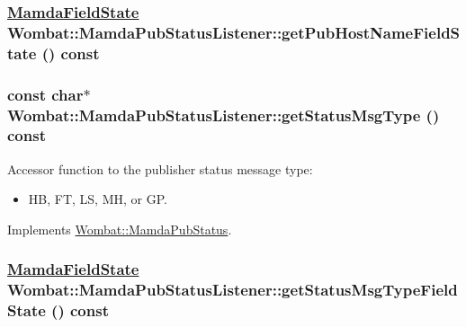 \hypertarget{classWombat_1_1MamdaPubStatusListener_0113c4afc2de92bbae16a85dbd0b76a5}{
\subsubsection[getPubHostNameFieldState]{\setlength{\rightskip}{0pt plus 5cm}\hyperlink{namespaceWombat_93aac974f2ab713554fd12a1fa3b7d2a}{Mamda\-Field\-State} Wombat::Mamda\-Pub\-Status\-Listener::get\-Pub\-Host\-Name\-Field\-State () const}}
\label{classWombat_1_1MamdaPubStatusListener_0113c4afc2de92bbae16a85dbd0b76a5}


\hypertarget{classWombat_1_1MamdaPubStatusListener_e18c97b1a454d45755dd48f8a56a742d}{
\subsubsection[getStatusMsgType]{\setlength{\rightskip}{0pt plus 5cm}const char$\ast$ Wombat::Mamda\-Pub\-Status\-Listener::get\-Status\-Msg\-Type () const}}
\label{classWombat_1_1MamdaPubStatusListener_e18c97b1a454d45755dd48f8a56a742d}


Accessor function to the publisher status message type:\begin{itemize}
\item HB, FT, LS, MH, or GP. \end{itemize}




Implements \hyperlink{classWombat_1_1MamdaPubStatus_72d3f8a795323662c919e6f7cdd12a66}{Wombat::Mamda\-Pub\-Status}.\hypertarget{classWombat_1_1MamdaPubStatusListener_f9c9da5b1ab98b723a87fe8a460b3901}{
\subsubsection[getStatusMsgTypeFieldState]{\setlength{\rightskip}{0pt plus 5cm}\hyperlink{namespaceWombat_93aac974f2ab713554fd12a1fa3b7d2a}{Mamda\-Field\-State} Wombat::Mamda\-Pub\-Status\-Listener::get\-Status\-Msg\-Type\-Field\-State () const}}
\label{classWombat_1_1MamdaPubStatusListener_f9c9da5b1ab98b723a87fe8a460b3901}



